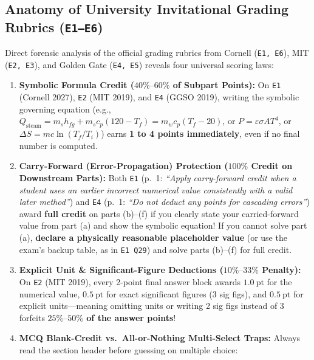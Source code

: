 \subsection{Anatomy of University Invitational Grading Rubrics (\texttt{E1--E6})}
Direct forensic analysis of the official grading rubrics from Cornell (\texttt{E1, E6}), MIT (\texttt{E2, E3}), and Golden Gate (\texttt{E4, E5})  reveals four universal scoring laws:
\begin{enumerate}
  \item \textbf{Symbolic Formula Credit ($40\%\text{--}60\%$ of Subpart Points):} On \texttt{E1} (Cornell 2027), \texttt{E2} (MIT 2019), and \texttt{E4} (GGSO 2019), writing the symbolic governing equation (e.g., $Q_{\mathrm{steam}} = m_s h_{fg} + m_s c_p(120 - T_f) = m_w c_p(T_f - 20)$, or $P = \varepsilon\sigma A T^4$, or $\Delta S = m c\ln(T_f/T_i)$) earns \textbf{1 to 4 points immediately}, even if no final number is computed.
  \item \textbf{Carry-Forward (Error-Propagation) Protection ($100\%$ Credit on Downstream Parts):} Both \texttt{E1} (p.\ 1: \textit{``Apply carry-forward credit when a student uses an earlier incorrect numerical value consistently with a valid later method''}) and \texttt{E4} (p.\ 1: \textit{``Do not deduct any points for cascading errors''}) award \textbf{full credit} on parts (b)--(f) if you clearly state your carried-forward value from part (a) and show the symbolic equation! If you cannot solve part (a), \textbf{declare a physically reasonable placeholder value} (or use the exam's backup table, as in \texttt{E1 Q29}) and solve parts (b)--(f) for full credit.
  \item \textbf{Explicit Unit \& Significant-Figure Deductions ($10\%\text{--}33\%$ Penalty):} On \texttt{E2} (MIT 2019), every 2-point final answer block awards $\SI{1.0}{\text{pt}}$ for the numerical value, $\SI{0.5}{\text{pt}}$ for exact significant figures (3 sig figs), and $\SI{0.5}{\text{pt}}$ for explicit units---meaning omitting units or writing 2 sig figs instead of 3 forfeits \textbf{$25\%\text{--}50\%$ of the answer points}!
  \item \textbf{MCQ Blank-Credit vs.\ All-or-Nothing Multi-Select Traps:} Always read the section header before guessing on multiple choice:
\end{enumerate}

